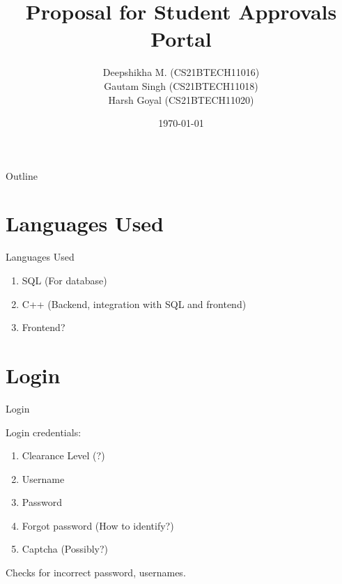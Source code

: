\documentclass{beamer}
\title{Proposal for Student Approvals Portal}
\author[Deepshikha M. (CS21BTECH11016)]{Deepshikha M. (CS21BTECH11016) \\
Gautam Singh (CS21BTECH11018) \\
Harsh Goyal (CS21BTECH11020)}
\date{\today}
\begin{document}
\begin{frame}
    \titlepage 
\end{frame}

\logo{}


\begin{frame}{Outline}
    \tableofcontents
\end{frame}

\section{Languages Used}
\begin{frame}{Languages Used}
\begin{enumerate}
\item SQL (For database)
\item C++ (Backend, integration with SQL and frontend)
\item Frontend?
\end{enumerate}
\end{frame}

\section{Login}
\begin{frame}{Login}

Login credentials:

\begin{enumerate}
\item Clearance Level (?)
\item Username
\item Password
\item Forgot password (How to identify?)
\item Captcha (Possibly?)
\end{enumerate}

Checks for incorrect password, usernames.
\end{frame}
\end{document}
